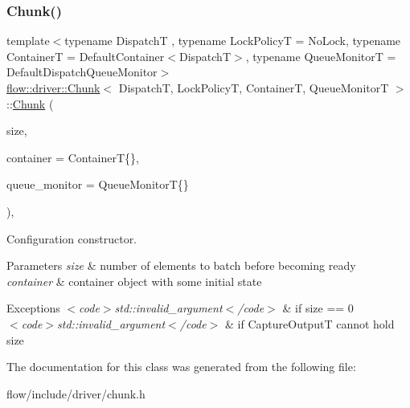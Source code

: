\subsubsection{\texorpdfstring{Chunk()}{Chunk()}}
{\footnotesize\ttfamily template$<$typename DispatchT , typename Lock\+PolicyT  = No\+Lock, typename ContainerT  = Default\+Container$<$\+Dispatch\+T$>$, typename Queue\+MonitorT  = Default\+Dispatch\+Queue\+Monitor$>$ \\
\hyperlink{classflow_1_1driver_1_1_chunk}{flow\+::driver\+::\+Chunk}$<$ DispatchT, Lock\+PolicyT, ContainerT, Queue\+MonitorT $>$\+::\hyperlink{classflow_1_1driver_1_1_chunk}{Chunk} (\begin{DoxyParamCaption}\item[{const \hyperlink{classflow_1_1driver_1_1_chunk_ae04fbc608b52a2d35165e2ef95d742c3}{size\+\_\+type}}]{size,  }\item[{const ContainerT \&}]{container = {\ttfamily ContainerT\{\}},  }\item[{const Queue\+MonitorT \&}]{queue\+\_\+monitor = {\ttfamily QueueMonitorT\{\}} }\end{DoxyParamCaption})\hspace{0.3cm}{\ttfamily [explicit]}, {\ttfamily [noexcept]}}



Configuration constructor. 


\begin{DoxyParams}{Parameters}
{\em size} & number of elements to batch before becoming ready \\
\hline
{\em container} & container object with some initial state\\
\hline
\end{DoxyParams}

\begin{DoxyExceptions}{Exceptions}
{\em $<$code$>$std\+::invalid\+\_\+argument$<$/code$>$} & if {\ttfamily size == 0} \\
\hline
{\em $<$code$>$std\+::invalid\+\_\+argument$<$/code$>$} & if {\ttfamily Capture\+OutputT} cannot hold {\ttfamily size} \\
\hline
\end{DoxyExceptions}


The documentation for this class was generated from the following file\+:\begin{DoxyCompactItemize}
\item 
flow/include/driver/chunk.\+h\end{DoxyCompactItemize}
